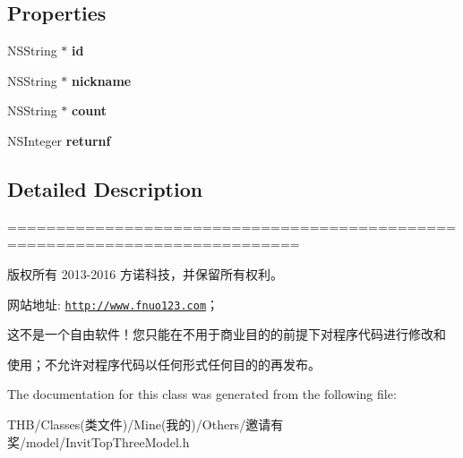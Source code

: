 \subsection*{Properties}
\begin{DoxyCompactItemize}
\item 
\mbox{\label{interface_invit_top_three_model_ad6fc16175e910041891e835878a338f1}} 
N\+S\+String $\ast$ {\bfseries id}
\item 
\mbox{\label{interface_invit_top_three_model_a8370d895dd15458d4903407169ac644f}} 
N\+S\+String $\ast$ {\bfseries nickname}
\item 
\mbox{\label{interface_invit_top_three_model_a7c3ab8048fff643f6e1f7495526d8700}} 
N\+S\+String $\ast$ {\bfseries count}
\item 
\mbox{\label{interface_invit_top_three_model_a8286174475a1783a35980fd4d9bf08e9}} 
N\+S\+Integer {\bfseries returnf}
\end{DoxyCompactItemize}


\subsection{Detailed Description}
============================================================================

版权所有 2013-\/2016 方诺科技，并保留所有权利。

网站地址\+: \href{http://www.fnuo123.com}{\tt http\+://www.\+fnuo123.\+com}； 



这不是一个自由软件！您只能在不用于商业目的的前提下对程序代码进行修改和

使用；不允许对程序代码以任何形式任何目的的再发布。 

 

The documentation for this class was generated from the following file\+:\begin{DoxyCompactItemize}
\item 
T\+H\+B/\+Classes(类文件)/\+Mine(我的)/\+Others/邀请有奖/model/Invit\+Top\+Three\+Model.\+h\end{DoxyCompactItemize}
